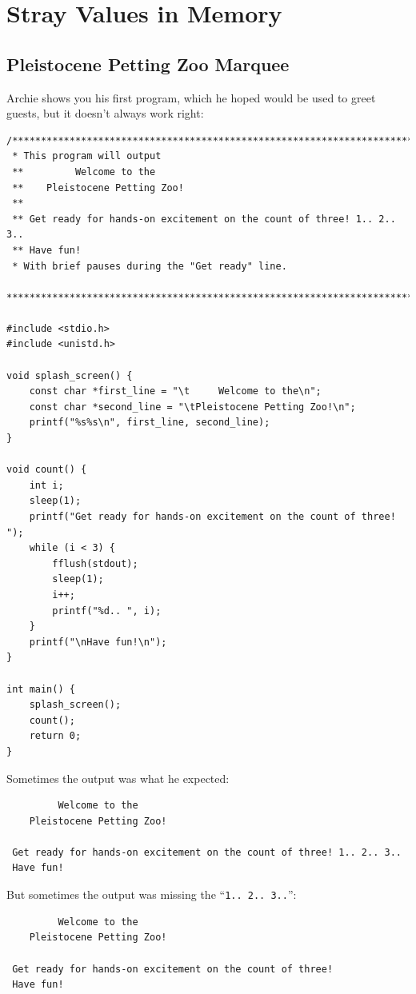 \section{Stray Values in Memory}

\subsection{Pleistocene Petting Zoo Marquee}\label{sec:uninitializedVariables}

Archie shows you his first program, which he hoped would be used to greet
guests, but it doesn't always work right:

\begin{lstlisting}
/***********************************************************************
 * This program will output
 **         Welcome to the
 **    Pleistocene Petting Zoo!
 **
 ** Get ready for hands-on excitement on the count of three! 1.. 2.. 3..
 ** Have fun!
 * With brief pauses during the "Get ready" line.
 ***********************************************************************/

#include <stdio.h>
#include <unistd.h>

void splash_screen() {
    const char *first_line = "\t     Welcome to the\n";
    const char *second_line = "\tPleistocene Petting Zoo!\n";
    printf("%s%s\n", first_line, second_line);
}

void count() {
    int i;
    sleep(1);
    printf("Get ready for hands-on excitement on the count of three! ");
    while (i < 3) {
        fflush(stdout);
        sleep(1);
        i++;
        printf("%d.. ", i);
    }
    printf("\nHave fun!\n");
}

int main() {
    splash_screen();
    count();
    return 0;
}
\end{lstlisting}

Sometimes the output was what he expected:
\begin{verbatim}
         Welcome to the
    Pleistocene Petting Zoo!

 Get ready for hands-on excitement on the count of three! 1.. 2.. 3..
 Have fun!
\end{verbatim}

But sometimes the output was missing the
``\texttt{1.. 2.. 3..}'':
\begin{verbatim}
         Welcome to the
    Pleistocene Petting Zoo!

 Get ready for hands-on excitement on the count of three!
 Have fun!
\end{verbatim}

